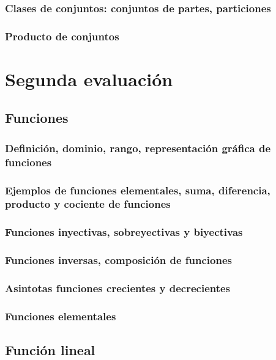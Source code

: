 \subsection{Clases de conjuntos: conjuntos de partes, particiones}

\subsection{Producto de conjuntos}

\cleardoublepage
\chapter{Segunda evaluación}

\section{Funciones}

\subsection{Definición, dominio, rango, representación gráfica de funciones}

\subsection{Ejemplos de funciones elementales, suma, diferencia, producto y cociente de funciones}

\subsection{Funciones inyectivas, sobreyectivas y biyectivas}

\subsection{Funciones inversas, composición de funciones}

\subsection{Asintotas funciones crecientes y decrecientes}

\subsection{Funciones elementales}

\section{Función lineal}

